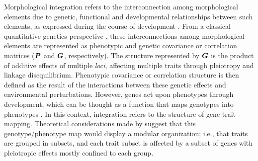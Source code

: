 \documentclass [twocolumn, natbib, nospthms, 10pt] {svjour3}
\begin{document}
Morphological integration refers to the interconnection among
morphological elements due to genetic, functional and developmental
relationships between such elements, as expressed during the course of
development \citep{olson_morphological_1958,
  cheverud_developmental_1996}. From a classical quantitative genetics
perspective \citep{falconer_introduction_1996}, these interconnections
among morphological elements are represented as phenotypic and genetic
covariance or correlation matrices ($\boldsymbol{P}$ and $\boldsymbol{G}$,
respectively). The structure represented by $\boldsymbol{G}$ is the
product of additive effects of multiple \emph{loci}, affecting
multiple traits through pleiotropy and linkage
disequilibrium. Phenotypic covariance or correlation structure is then
defined as the result of the interactions between these genetic
effects and environmental perturbations. However, genes act upon
phenotypes through development, which can be thought as a function
that maps genotypes into phenotypes \citep{wagner_eigenvalue_1984,
  polly_developmental_2008}. In this context, integration refers to
the structure of gene-trait mapping. Theoretical considerations made
by \citet{wagner_homologues_1996} suggest that this genotype/phenotype
map would display a modular organization; i.e., that traits are
grouped in subsets, and each trait subset is affected by a subset of
genes with pleiotropic effects mostly confined to each group.
\end{document}
